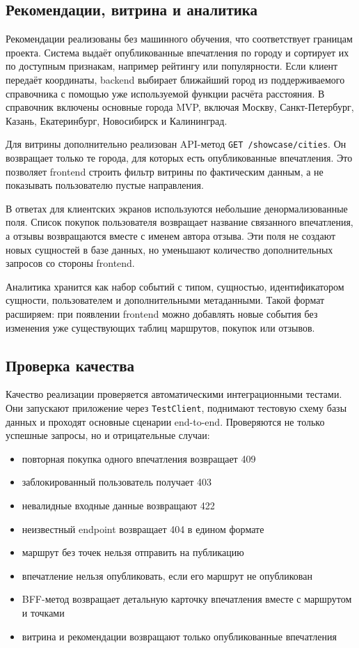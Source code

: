\documentclass[a4paper,12pt]{extarticle}
\begin{document}
\subsection{Рекомендации, витрина и аналитика}

Рекомендации реализованы без машинного обучения, что соответствует границам проекта. Система выдаёт опубликованные впечатления по городу и сортирует их по доступным признакам, например рейтингу или популярности. Если клиент передаёт координаты, backend выбирает ближайший город из поддерживаемого справочника с помощью уже используемой функции расчёта расстояния. В справочник включены основные города MVP, включая Москву, Санкт-Петербург, Казань, Екатеринбург, Новосибирск и Калининград.

Для витрины дополнительно реализован API-метод \texttt{GET /showcase/cities}. Он возвращает только те города, для которых есть опубликованные впечатления. Это позволяет frontend строить фильтр витрины по фактическим данным, а не показывать пользователю пустые направления.

В ответах для клиентских экранов используются небольшие денормализованные поля. Список покупок пользователя возвращает название связанного впечатления, а отзывы возвращаются вместе с именем автора отзыва. Эти поля не создают новых сущностей в базе данных, но уменьшают количество дополнительных запросов со стороны frontend.

Аналитика хранится как набор событий с типом, сущностью, идентификатором сущности, пользователем и дополнительными метаданными. Такой формат расширяем: при появлении frontend можно добавлять новые события без изменения уже существующих таблиц маршрутов, покупок или отзывов.

\subsection{Проверка качества}

Качество реализации проверяется автоматическими интеграционными тестами. Они запускают приложение через \texttt{TestClient}, поднимают тестовую схему базы данных и проходят основные сценарии end-to-end. Проверяются не только успешные запросы, но и отрицательные случаи:
\begin{itemize}
	\item повторная покупка одного впечатления возвращает 409
	\item заблокированный пользователь получает 403
	\item невалидные входные данные возвращают 422
	\item неизвестный endpoint возвращает 404 в едином формате
	\item маршрут без точек нельзя отправить на публикацию
	\item впечатление нельзя опубликовать, если его маршрут не опубликован
	\item BFF-метод возвращает детальную карточку впечатления вместе с маршрутом и точками
	\item витрина и рекомендации возвращают только опубликованные впечатления
\end{itemize}
\end{document}
